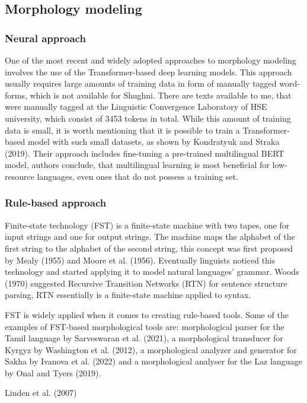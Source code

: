 \subsection{Morphology modeling}
\subsubsection{Neural approach}
\par One of the most recent and widely adopted approaches to morphology modeling involves the use of the Transformer-based deep learning models. This approach usually requires large amounts of training data in form of manually tagged word-forms, which is not available for Shughni. There are texts available to me, that were manually tagged at the Linguistic Convergence Laboratory of HSE university, which consist of 3453 tokens in total. While this amount of training data is small, it is worth mentioning that it is possible to train a Transformer-based model with such small datasets, as shown by Kondratyuk and Straka (2019). Their approach includes fine-tuning a pre-trained multilingual BERT model, authors conclude, that multilingual learning is most beneficial for low-resource languages, even ones that do not possess a training set.
\subsubsection{Rule-based approach}
\par Finite-state technology (FST) is a finite-state machine with two tapes, one for input strings and one for output strings. The machine maps the alphabet of the first string to the alphabet of the second string, this concept was first proposed by Mealy (1955) and Moore et al. (1956). Eventually linguists noticed this technology and started applying it to model natural languages' grammar. Woods (1970) suggested Recursive Transition Networks (RTN) for sentence structure parsing, RTN essentially is a finite-state machine applied to syntax. 
\par {}
\par FST is widely applied when it comes to creating rule-based tools. Some of the examples of FST-based morphological tools are: morphological parser for the Tamil language by Sarveswaran et al. (2021), a morphological transducer for Kyrgyz by Washington et al. (2012), a morphological analyzer and generator for Sakha by Ivanova et al. (2022) and a morphological analyser for the Laz language by Onal and Tyers (2019).

\par Linden et al. (2007)